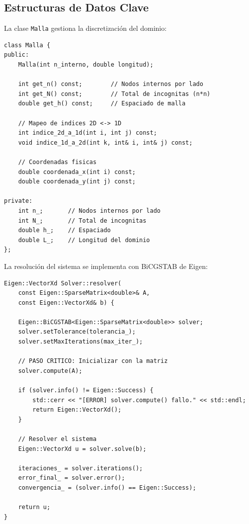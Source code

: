 \documentclass[12pt,a4paper]{article}
\theoremstyle{definition}
\begin{document}
\subsection{Estructuras de Datos Clave}

La clase \texttt{Malla} gestiona la discretizaci\'{o}n del dominio:

\begin{lstlisting}[caption={Clase Malla (src/malla.hpp).}]
class Malla {
public:
    Malla(int n_interno, double longitud);
    
    int get_n() const;        // Nodos internos por lado
    int get_N() const;        // Total de incognitas (n*n)
    double get_h() const;     // Espaciado de malla
    
    // Mapeo de indices 2D <-> 1D
    int indice_2d_a_1d(int i, int j) const;
    void indice_1d_a_2d(int k, int& i, int& j) const;
    
    // Coordenadas fisicas
    double coordenada_x(int i) const;
    double coordenada_y(int j) const;

private:
    int n_;       // Nodos internos por lado
    int N_;       // Total de incognitas
    double h_;    // Espaciado
    double L_;    // Longitud del dominio
};
\end{lstlisting}

La resoluci\'{o}n del sistema se implementa con BiCGSTAB de Eigen:

\begin{lstlisting}[caption={Solver BiCGSTAB (src/solver.cpp).}]
Eigen::VectorXd Solver::resolver(
    const Eigen::SparseMatrix<double>& A,
    const Eigen::VectorXd& b) {
    
    Eigen::BiCGSTAB<Eigen::SparseMatrix<double>> solver;
    solver.setTolerance(tolerancia_);
    solver.setMaxIterations(max_iter_);
    
    // PASO CRITICO: Inicializar con la matriz
    solver.compute(A);
    
    if (solver.info() != Eigen::Success) {
        std::cerr << "[ERROR] solver.compute() fallo." << std::endl;
        return Eigen::VectorXd();
    }
    
    // Resolver el sistema
    Eigen::VectorXd u = solver.solve(b);
    
    iteraciones_ = solver.iterations();
    error_final_ = solver.error();
    convergencia_ = (solver.info() == Eigen::Success);
    
    return u;
}
\end{lstlisting}
\end{document}
